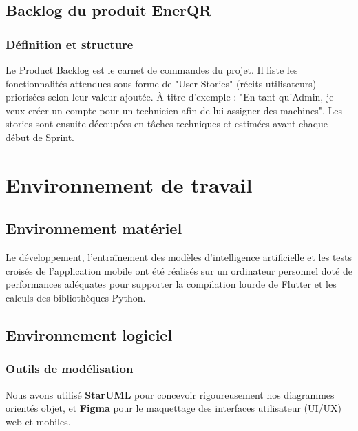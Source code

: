 \documentclass[12pt,a4paper]{report}
\begin{document}
\subsection{Backlog du produit EnerQR}
\subsubsection{Définition et structure}
Le Product Backlog est le carnet de commandes du projet. Il liste les fonctionnalités attendues sous forme de "User Stories" (récits utilisateurs) priorisées selon leur valeur ajoutée. À titre d'exemple : "En tant qu'Admin, je veux créer un compte pour un technicien afin de lui assigner des machines". Les stories sont ensuite découpées en tâches techniques et estimées avant chaque début de Sprint.

\section{Environnement de travail}
\subsection{Environnement matériel}
Le développement, l'entraînement des modèles d'intelligence artificielle et les tests croisés de l'application mobile ont été réalisés sur un ordinateur personnel doté de performances adéquates pour supporter la compilation lourde de Flutter et les calculs des bibliothèques Python.

\subsection{Environnement logiciel}
\subsubsection{Outils de modélisation}
Nous avons utilisé \textbf{StarUML} pour concevoir rigoureusement nos diagrammes orientés objet, et \textbf{Figma} pour le maquettage des interfaces utilisateur (UI/UX) web et mobiles.
\end{document}
